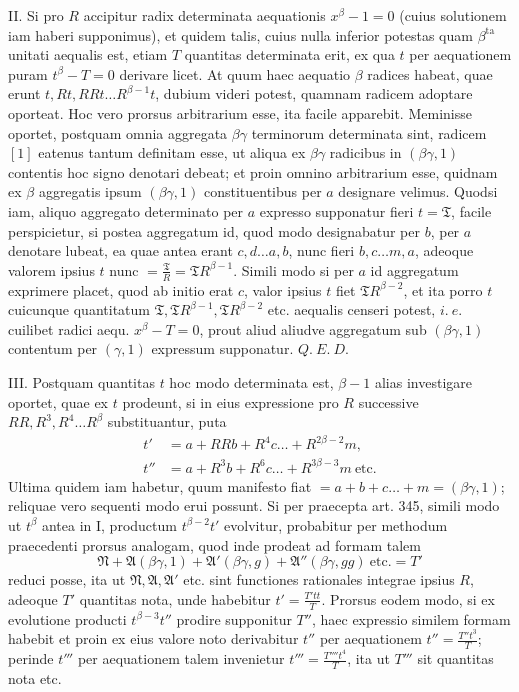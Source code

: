 II. Si pro \(R\) accipitur radix determinata aequationis \(x^\beta-1=0\) (cuius solutionem iam haberi supponimus), et quidem talis, cuius nulla inferior potestas quam \(\beta^{\mathrm{ta}}\) unitati aequalis est, etiam \(T\) quantitas determinata erit, ex qua \(t\) per aequationem puram \(t^\beta-T=0\) derivare licet. At quum haec aequatio \(\beta\) radices habeat, quae erunt \(t,\allowbreak Rt,\allowbreak RRt\ldots R^{\beta-1}t\), dubium videri potest, quamnam radicem adoptare oporteat. Hoc vero prorsus arbitrarium esse, ita facile apparebit. Meminisse oportet, postquam omnia aggregata \(\beta\gamma\) terminorum determinata sint, radicem \([1]\) eatenus tantum definitam esse, ut aliqua ex \(\beta\gamma\) radicibus in \((\beta\gamma,1)\) contentis hoc signo denotari debeat; et proin omnino arbitrarium esse, quidnam ex \(\beta\) aggregatis ipsum \((\beta\gamma,1)\) constituentibus per \(a\) designare velimus. Quodsi iam, aliquo aggregato determinato per \(a\) expresso supponatur fieri \(t=\mathfrak{T}\), facile perspicietur, si postea aggregatum id, quod modo designabatur per \(b\), per \(a\) denotare lubeat, ea quae antea erant \(c,\allowbreak d\ldots a,\allowbreak b\), nunc fieri \(b,\allowbreak c\ldots m,\allowbreak a\), adeoque valorem ipsius \(t\) nunc \(=\frac{\mathfrak{T}}R=\mathfrak{T}R^{\beta-1}\). Simili modo si per \(a\) id aggregatum exprimere placet, quod ab initio erat \(c\), valor ipsius \(t\) fiet \(\mathfrak{T}R^{\beta-2}\), et ita porro \(t\) cuicunque quantitatum \(\mathfrak{T},\allowbreak \mathfrak{T}R^{\beta-1},\allowbreak \mathfrak{T}R^{\beta-2}\) etc. aequalis censeri potest, \(i.\ e.\) cuilibet radici aequ. \(x^\beta-T=0\), prout aliud aliudve aggregatum sub \((\beta\gamma,1)\) contentum per \((\gamma,1)\) expressum supponatur. \(Q.\ E.\ D.\)

III. Postquam quantitas \(t\) hoc modo determinata est, \(\beta-1\) alias investigare oportet, quae ex \(t\) prodeunt, si in eius expressione pro \(R\) successive \(RR,\allowbreak R^3,\allowbreak R^4\ldots R^\beta\) substituantur, puta \[\begin{aligned}t'&=a+RRb+R^4c\ldots+R^{2\beta-2}m,\\t''&=a+R^3b+R^6c\ldots+R^{3\beta-3}m\ \text{etc.}\end{aligned}\] Ultima quidem iam habetur, quum manifesto fiat \(=a+b+c\ldots+m=(\beta\gamma,1)\); reliquae vero sequenti modo erui possunt. Si per praecepta art. 345, simili modo ut \(t^\beta\) antea in I, productum \(t^{\beta-2}t'\) evolvitur, probabitur per methodum praecedenti prorsus analogam, quod inde prodeat ad formam talem
\[\mathfrak{N}+\mathfrak{A}(\beta\gamma,1)+\mathfrak{A}'(\beta\gamma,g)+\mathfrak{A}''(\beta\gamma,gg)\ \text{etc.}=T'\] reduci posse, ita ut \(\mathfrak{N},\allowbreak \mathfrak{A},\allowbreak \mathfrak{A}'\) etc. sint functiones rationales integrae ipsius \(R\), adeoque \(T'\) quantitas nota, unde habebitur \(t'=\frac{T'tt}{T}\). Prorsus eodem modo, si ex evolutione producti \(t^{\beta-3}t''\) prodire supponitur \(T''\), haec expressio similem formam habebit et proin ex eius valore noto derivabitur \(t''\) per aequationem \(t''=\frac{T''t^3}{T}\); perinde \(t'''\) per aequationem talem invenietur \(t'''=\frac{T''''t^4}{T}\), ita ut \(T'''\) sit quantitas nota etc.

